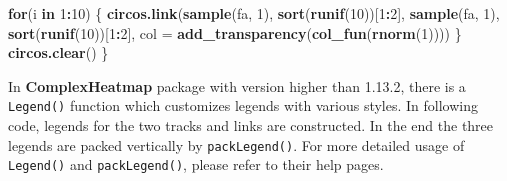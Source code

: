 \documentclass[]{book}
\newenvironment{Shaded}{\begin{snugshade}}{\end{snugshade}}
\newcommand{\KeywordTok}[1]{\textcolor[rgb]{0.13,0.29,0.53}{\textbf{#1}}}
\newcommand{\DataTypeTok}[1]{\textcolor[rgb]{0.13,0.29,0.53}{#1}}
\newcommand{\DecValTok}[1]{\textcolor[rgb]{0.00,0.00,0.81}{#1}}
\newcommand{\ControlFlowTok}[1]{\textcolor[rgb]{0.13,0.29,0.53}{\textbf{#1}}}
\newcommand{\OperatorTok}[1]{\textcolor[rgb]{0.81,0.36,0.00}{\textbf{#1}}}
\newcommand{\NormalTok}[1]{#1}
\theoremstyle{definition}
\theoremstyle{definition}
\theoremstyle{remark}
\begin{document}
\begin{Shaded}
\begin{Highlighting}[]
    \ControlFlowTok{for}\NormalTok{(i }\ControlFlowTok{in} \DecValTok{1}\OperatorTok{:}\DecValTok{10}\NormalTok{) \{}
        \KeywordTok{circos.link}\NormalTok{(}\KeywordTok{sample}\NormalTok{(fa, }\DecValTok{1}\NormalTok{), }\KeywordTok{sort}\NormalTok{(}\KeywordTok{runif}\NormalTok{(}\DecValTok{10}\NormalTok{))[}\DecValTok{1}\OperatorTok{:}\DecValTok{2}\NormalTok{], }
                    \KeywordTok{sample}\NormalTok{(fa, }\DecValTok{1}\NormalTok{), }\KeywordTok{sort}\NormalTok{(}\KeywordTok{runif}\NormalTok{(}\DecValTok{10}\NormalTok{))[}\DecValTok{1}\OperatorTok{:}\DecValTok{2}\NormalTok{],}
                    \DataTypeTok{col =} \KeywordTok{add_transparency}\NormalTok{(}\KeywordTok{col_fun}\NormalTok{(}\KeywordTok{rnorm}\NormalTok{(}\DecValTok{1}\NormalTok{))))}
\NormalTok{    \}}
    \KeywordTok{circos.clear}\NormalTok{()}
\NormalTok{\}}
\end{Highlighting}
\end{Shaded}

In \textbf{ComplexHeatmap} package with version higher than 1.13.2,
there is a \texttt{Legend()} function which customizes legends with
various styles. In following code, legends for the two tracks and links
are constructed. In the end the three legends are packed vertically by
\texttt{packLegend()}. For more detailed usage of \texttt{Legend()} and
\texttt{packLegend()}, please refer to their help pages.
\end{document}
